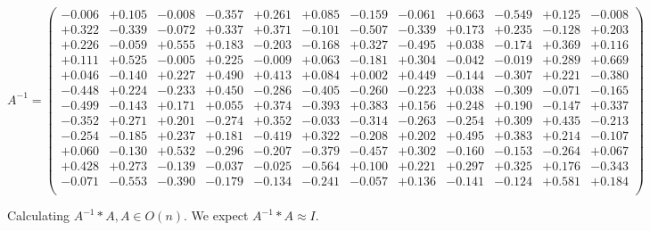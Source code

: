 \documentclass[9pt]{article}
\theoremstyle{plain}
\theoremstyle{definition}
\theoremstyle{remark}
\numberwithin{equation}{section}
\begin{document}
$A^{-1} = \left(
\begin{array}{
cccccccccccc}
-0.006 & +0.105 & -0.008 & -0.357 & +0.261 & +0.085 & -0.159 & -0.061 & +0.663 & -0.549 & +0.125 & -0.008 \\
+0.322 & -0.339 & -0.072 & +0.337 & +0.371 & -0.101 & -0.507 & -0.339 & +0.173 & +0.235 & -0.128 & +0.203 \\
+0.226 & -0.059 & +0.555 & +0.183 & -0.203 & -0.168 & +0.327 & -0.495 & +0.038 & -0.174 & +0.369 & +0.116 \\
+0.111 & +0.525 & -0.005 & +0.225 & -0.009 & +0.063 & -0.181 & +0.304 & -0.042 & -0.019 & +0.289 & +0.669 \\
+0.046 & -0.140 & +0.227 & +0.490 & +0.413 & +0.084 & +0.002 & +0.449 & -0.144 & -0.307 & +0.221 & -0.380 \\
-0.448 & +0.224 & -0.233 & +0.450 & -0.286 & -0.405 & -0.260 & -0.223 & +0.038 & -0.309 & -0.071 & -0.165 \\
-0.499 & -0.143 & +0.171 & +0.055 & +0.374 & -0.393 & +0.383 & +0.156 & +0.248 & +0.190 & -0.147 & +0.337 \\
-0.352 & +0.271 & +0.201 & -0.274 & +0.352 & -0.033 & -0.314 & -0.263 & -0.254 & +0.309 & +0.435 & -0.213 \\
-0.254 & -0.185 & +0.237 & +0.181 & -0.419 & +0.322 & -0.208 & +0.202 & +0.495 & +0.383 & +0.214 & -0.107 \\
+0.060 & -0.130 & +0.532 & -0.296 & -0.207 & -0.379 & -0.457 & +0.302 & -0.160 & -0.153 & -0.264 & +0.067 \\
+0.428 & +0.273 & -0.139 & -0.037 & -0.025 & -0.564 & +0.100 & +0.221 & +0.297 & +0.325 & +0.176 & -0.343 \\
-0.071 & -0.553 & -0.390 & -0.179 & -0.134 & -0.241 & -0.057 & +0.136 & -0.141 & -0.124 & +0.581 & +0.184 \\
\end{array}
\right)$ \newline 

Calculating $A^{-1} *A  ,  A \in O(n)$.   We expect $A^{-1} *A  \approx I$. 
\end{document}
